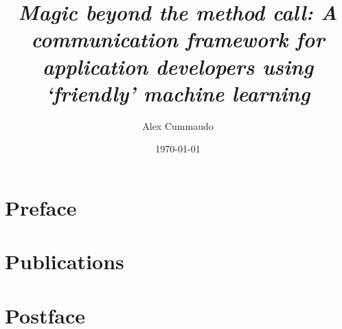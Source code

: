 \documentclass[twoside,12pt,titlepage]{book}
\title{
  \itshape Magic beyond the method call:            %
  \upshape A communication framework                %
           for application developers               %
           using `friendly' machine learning        %
}
\author{Alex Cummaudo}
\date{\today}
\begin{document}
\frontmatter






\mainmatter

\part{Preface}
\begin{bibunit}
  
  
  
  
\end{bibunit}

\part{Publications}




\part{Postface}
\begin{bibunit}
  
\end{bibunit}

\appendix

\end{document}
